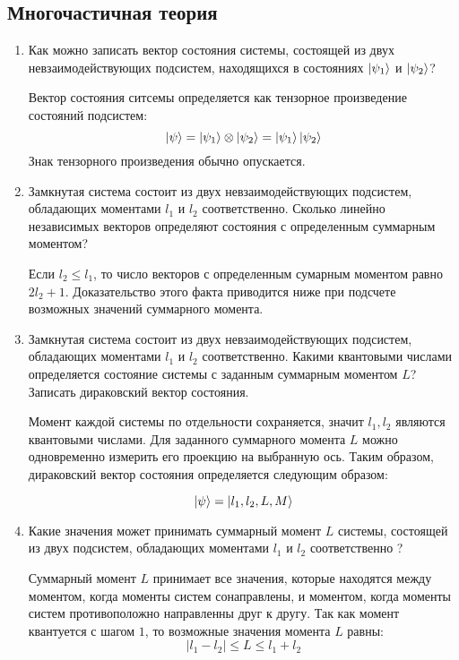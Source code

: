 \documentclass{article}
\begin{document}
\subsection*{Многочастичная теория}
\begin{enumerate}
	\item {Как можно записать вектор состояния системы, состоящей из двух невзаимодействующих подсистем, находящихся в состояниях $\ket{\psi_1}$ и $\ket{\psi_2}$?}	
	
	Вектор состояния ситсемы определяется как тензорное произведение состояний подсистем:
	\begin{equation}
		\ket{\psi} = \ket{\psi_1} \otimes \ket{\psi_2} = \ket{\psi_1} \ket{\psi_2}
	\end{equation}
	Знак тензорного произведения обычно опускается.
	
	\item {Замкнутая система состоит из двух невзаимодействующих подсистем, обладающих моментами $l_1$ и $l_2$ соответственно. Сколько линейно независимых векторов определяют состояния с определенным суммарным моментом?}	
	
	Если $l_2 \leq l_1$, то число векторов с определенным сумарным моментом равно $2l_2 + 1$. Доказательство этого факта приводится ниже при подсчете возможных значений суммарного момента.
	
	\item {Замкнутая система состоит из двух невзаимодействующих подсистем, обладающих моментами $l_1$ и $l_2$ соответственно. Какими квантовыми числами определяется состояние системы с заданным суммарным моментом $L$? Записать дираковский вектор состояния.}	
	
	Момент каждой системы по отдельности сохраняется, значит $l_1, l_2$ являются квантовыми числами. Для заданного суммарного момента $L$ можно одновременно измерить его проекцию на выбранную ось. Таким образом, дираковский вектор состояния определяется следующим образом:
	
	\begin{equation}
		\ket{\psi} = \ket{l_1, l_2, L, M}
	\end{equation}
	
	\item {Какие значения может принимать суммарный момент $L$ системы, состоящей из двух подсистем, обладающих моментами $l_1$ и $l_2$ соответственно ?}
	
	Суммарный момент $L$ принимает все значения, которые находятся между моментом, когда моменты систем сонаправлены, и моментом, когда моменты систем противоположно направленны друг к другу. Так как момент квантуется с шагом $1$, то возможные значения момента $L$ равны:
	\begin{equation}
		|l_1 - l_2| \leq L \leq l_1 + l_2
	\end{equation}
	

\end{enumerate}
\end{document}
